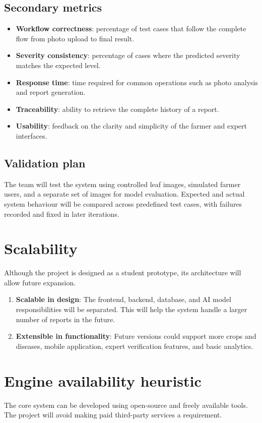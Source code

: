 \documentclass[11pt,a4paper]{article}
\begin{document}
\subsection{Secondary metrics}
\begin{itemize}[leftmargin=*]
    \item \textbf{Workflow correctness}: percentage of test cases that follow the complete flow from photo upload to final result.
    \item \textbf{Severity consistency}: percentage of cases where the predicted severity matches the expected level.
    \item \textbf{Response time}: time required for common operations such as photo analysis and report generation.
    \item \textbf{Traceability}: ability to retrieve the complete history of a report.
    \item \textbf{Usability}: feedback on the clarity and simplicity of the farmer and expert interfaces.
\end{itemize}

\subsection{Validation plan}
The team will test the system using controlled leaf images, simulated farmer users, and a separate set of images for model evaluation. Expected and actual system behaviour will be compared across predefined test cases, with failures recorded and fixed in later iterations.

\section{Scalability}
Although the project is designed as a student prototype, its architecture will allow future expansion.

\begin{enumerate}[leftmargin=*]
    \item \textbf{Scalable in design}: The frontend, backend, database, and AI model responsibilities will be separated. This will help the system handle a larger number of reports in the future.
    \item \textbf{Extensible in functionality}: Future versions could support more crops and diseases, mobile application, expert verification features, and basic analytics.
\end{enumerate}

\section{Engine availability heuristic}
The core system can be developed using open-source and freely available tools. The project will avoid making paid third-party services a requirement.
\end{document}
